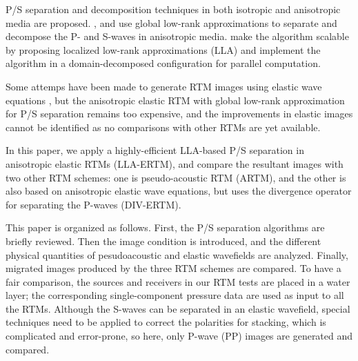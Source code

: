 \documentclass[manuscript,ulem,graphix,revised]{geophysics}
\begin{document}
P/S separation and decomposition techniques in both isotropic \citep{morse53, sun99, wenlong15} and anisotropic \citep{dellinger90,zhang10} media are proposed. \citet{cheng14}, \citet{cheng16} and \citet{Sripanich16} use global low-rank approximations to separate and decompose the P- and S-waves in anisotropic media. \citet{wenlong17} make the algorithm scalable by proposing localized low-rank approximations (LLA) and implement the algorithm in a domain-decomposed configuration for parallel computation.

Some attemps have been made to generate RTM images using elastic wave equations \citep{yan07,wenlong15b,wang16}, but the anisotropic elastic RTM with global low-rank approximation for P/S separation remains too expensive, and the improvements in elastic images cannot be identified as no comparisons with other RTMs are yet available.

In this paper, we  apply a highly-efficient LLA-based P/S separation in anisotropic elastic RTMs (LLA-ERTM), and compare the resultant images with two other RTM schemes: one is pseudo-acoustic RTM (ARTM), and the other is also based on anisotropic elastic wave equations, but uses the divergence operator for separating the P-waves (DIV-ERTM). 

This paper is organized as follows. First, the P/S separation algorithms are briefly reviewed. Then the image condition is introduced, and the different physical quantities of pesudoacoustic and elastic wavefields are analyzed. Finally, migrated images produced by the three RTM schemes are compared. 
To have a fair comparison, the sources and receivers in our RTM tests are placed in a water layer; the corresponding single-component pressure data are used as input to all the RTMs. Although the S-waves can be separated in an elastic wavefield, special techniques need to be applied to correct the polarities for stacking, which is complicated and error-prone, so here, only P-wave (PP) images are generated and compared.

\end{document}
